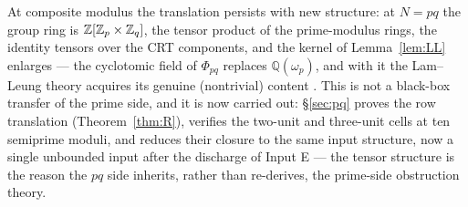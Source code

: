 At composite modulus the translation persists with new structure: at
$N=pq$ the group ring is $\mathbb{Z}[\mathbb{Z}_p\times\mathbb{Z}_q]$, the tensor product of the
prime-modulus rings, the identity tensors over the CRT components, and the
kernel of Lemma~\ref{lem:LL} enlarges --- the cyclotomic field of $\Phi_{pq}$
replaces $\mathbb{Q}(\omega_p)$, and with it the Lam--Leung theory acquires its
genuine (nontrivial) content \cite{LamLeung}. This is not a black-box
transfer of the prime side, and it is now carried out: \S\ref{sec:pq}
proves the row translation (Theorem~\ref{thm:R}), verifies the two-unit
and three-unit cells at ten semiprime moduli, and reduces their closure to
the same input structure, now a single unbounded input after the discharge
of Input E --- the tensor structure is the reason the $pq$ side
inherits, rather than re-derives, the prime-side obstruction theory.
